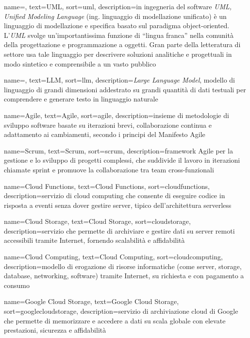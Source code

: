  {
    name=,
    text=UML,
    sort=uml,
    description={in ingegneria del software \emph{UML, Unified Modeling Language} (ing. linguaggio di modellazione unificato) è un linguaggio di modellazione e specifica basato sul paradigma object-oriented. L'\emph{UML} svolge un'importantissima funzione di ``lingua franca'' nella comunità della progettazione e programmazione a oggetti. Gran parte della letteratura di settore usa tale linguaggio per descrivere soluzioni analitiche e progettuali in modo sintetico e comprensibile a un vasto pubblico}
}

 {
    name=,
    text=LLM,
    sort=llm,
    description={\emph{Large Language Model}, modello di linguaggio di grandi dimensioni addestrato su grandi quantità di dati testuali per comprendere e generare testo in linguaggio naturale}
}

 {
    name=Agile,
    text=Agile,
    sort=agile,
    description={insieme di metodologie di sviluppo software basate su iterazioni brevi, collaborazione continua e adattamento ai cambiamenti, secondo i principi del Manifesto Agile}
}

 {
    name=Scrum,
    text=Scrum,
    sort=scrum,
    description={framework Agile per la gestione e lo sviluppo di progetti complessi, che suddivide il lavoro in iterazioni chiamate sprint e promuove la collaborazione tra team cross-funzionali}
}

 {
    name=Cloud Functions,
    text=Cloud Functions,
    sort=cloudfunctions,
    description={servizio di cloud computing che consente di eseguire codice in risposta a eventi senza dover gestire server, tipico dell'architettura serverless}
}

 {
    name=Cloud Storage,
    text=Cloud Storage,
    sort=cloudstorage,
    description={servizio che permette di archiviare e gestire dati su server remoti accessibili tramite Internet, fornendo scalabilità e affidabilità}
}

 {
    name=Cloud Computing,
    text=Cloud Computing,
    sort=cloudcomputing,
    description={modello di erogazione di risorse informatiche (come server, storage, database, networking, software) tramite Internet, su richiesta e con pagamento a consumo}
}

 {
    name=Google Cloud Storage,
    text=Google Cloud Storage,
    sort=googlecloudstorage,
    description={servizio di archiviazione cloud di Google che permette di memorizzare e accedere a dati su scala globale con elevate prestazioni, sicurezza e affidabilità}
}


